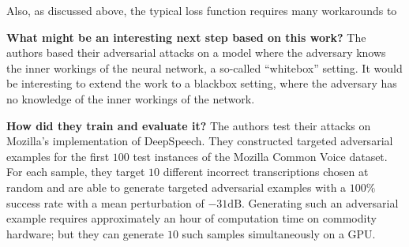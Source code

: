Also, as discussed above, the typical loss function requires many workarounds to

\noindent\textbf{What might be an interesting next step based on this work?} The
authors based their adversarial attacks on a model where the adversary knows the
inner workings of the neural network, a so-called ``whitebox'' setting. It would
be interesting to extend the work to a blackbox setting, where the adversary has
no knowledge of the inner workings of the network.


\noindent\textbf{How did they train and evaluate it?} The authors test their
attacks on Mozilla's implementation of DeepSpeech. They constructed targeted
adversarial examples for the first $100$ test instances of the Mozilla Common
Voice dataset. For each sample, they target $10$ different incorrect
transcriptions chosen at random and are able to generate targeted adversarial
examples with a $100\%$ success rate with a mean perturbation of $-31\text{
  dB}$. Generating such an adversarial example requires approximately an hour of
computation time on commodity hardware; but they can generate $10$ such samples
simultaneously on a GPU.


